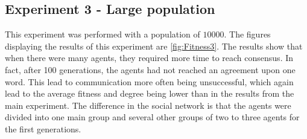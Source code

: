 \begin{figure}[htbp]
    \hfill
    \label{fig:SN2}
\end{figure}

\subsection{Experiment 3 - Large population}
This experiment was performed with a population of $10000$. The figures displaying the results of this experiment are \ref{fig:Fitness3}. The results show that when there were many agents, they required more time to reach consensus. In fact, after 100 generations, the agents had not reached an agreement upon one word. This lead to communication more often being unsuccessful, which again lead to the average fitness and degree being lower than in the results from the main experiment. The difference in the social network is that the agents were divided into one main group and several other groups of two to three agents for the first generations.
